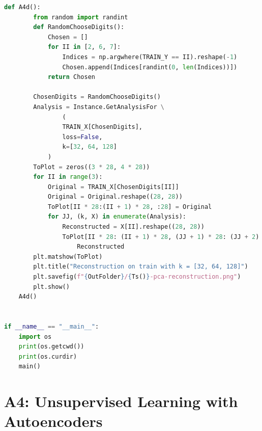 \documentclass[]{article}
\begin{document}
\begin{lstlisting}[language=python]
    def A4d():
        from random import randint
        def RandomChooseDigits():
            Chosen = []
            for II in [2, 6, 7]:
                Indices = np.argwhere(TRAIN_Y == II).reshape(-1)
                Chosen.append(Indices[randint(0, len(Indices))])
            return Chosen

        ChosenDigits = RandomChooseDigits()
        Analysis = Instance.GetAnalysisFor \
                (
                TRAIN_X[ChosenDigits],
                loss=False,
                k=[32, 64, 128]
            )
        ToPlot = zeros((3 * 28, 4 * 28))
        for II in range(3):
            Original = TRAIN_X[ChosenDigits[II]]
            Original = Original.reshape((28, 28))
            ToPlot[II * 28:(II + 1) * 28, :28] = Original
            for JJ, (k, X) in enumerate(Analysis):
                Reconstructed = X[II].reshape((28, 28))
                ToPlot[II * 28: (II + 1) * 28, (JJ + 1) * 28: (JJ + 2) * 28] = \
                    Reconstructed
        plt.matshow(ToPlot)
        plt.title("Reconstruction on train with k = [32, 64, 128]")
        plt.savefig(f"{OutFolder}/{Ts()}-pca-reconstruction.png")
        plt.show()
    A4d()


if __name__ == "__main__":
    import os
    print(os.getcwd())
    print(os.curdir)
    main()
        \end{lstlisting}
\section*{A4: Unsupervised Learning with Autoencoders}
\end{document}

